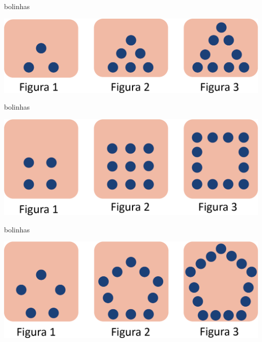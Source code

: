 \begin{escolha}
\item {} bolinhas

\begin{center}
\includegraphics[width=.7\textwidth]{./media/image33.png}
\end{center}

\item {} bolinhas

\begin{center}
\includegraphics[width=.7\textwidth]{./media/image34.png}
\end{center}
\item {} bolinhas

\begin{center}
\includegraphics[width=.7\textwidth]{./media/image35.png}
\end{center}
\end{escolha}

